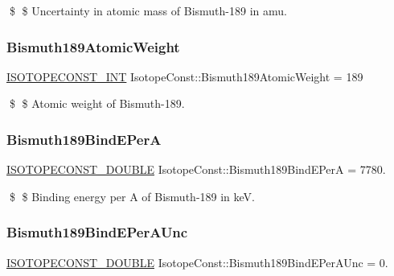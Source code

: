 \$ \$ Uncertainty in atomic mass of Bismuth-\/189 in amu. \mbox{\label{group___isotope_const-_bismuth-_bi189_gab45b4e9c48a817b9961343eb4846d7ef}} 
\subsubsection{\texorpdfstring{Bismuth189\+Atomic\+Weight}{Bismuth189AtomicWeight}}
{\footnotesize\ttfamily \mbox{\hyperlink{group___isotope_const-_macros_ga5f18360b3e99483a35c32d789e62621c}{I\+S\+O\+T\+O\+P\+E\+C\+O\+N\+S\+T\+\_\+\+I\+NT}} Isotope\+Const\+::\+Bismuth189\+Atomic\+Weight = 189}

\$ \$ Atomic weight of Bismuth-\/189. \mbox{\label{group___isotope_const-_bismuth-_bi189_ga3f3fb33a2a2e2ff686bc3c2a5c6863a4}} 
\subsubsection{\texorpdfstring{Bismuth189\+Bind\+E\+PerA}{Bismuth189BindEPerA}}
{\footnotesize\ttfamily \mbox{\hyperlink{group___isotope_const-_macros_ga8f45a7272ce02c0b4c65c44636ed719a}{I\+S\+O\+T\+O\+P\+E\+C\+O\+N\+S\+T\+\_\+\+D\+O\+U\+B\+LE}} Isotope\+Const\+::\+Bismuth189\+Bind\+E\+PerA = 7780.}

\$ \$ Binding energy per A of Bismuth-\/189 in keV. \mbox{\label{group___isotope_const-_bismuth-_bi189_gac9998c4e66a7e56b9702e8017a3db905}} 
\subsubsection{\texorpdfstring{Bismuth189\+Bind\+E\+Per\+A\+Unc}{Bismuth189BindEPerAUnc}}
{\footnotesize\ttfamily \mbox{\hyperlink{group___isotope_const-_macros_ga8f45a7272ce02c0b4c65c44636ed719a}{I\+S\+O\+T\+O\+P\+E\+C\+O\+N\+S\+T\+\_\+\+D\+O\+U\+B\+LE}} Isotope\+Const\+::\+Bismuth189\+Bind\+E\+Per\+A\+Unc = 0.}

